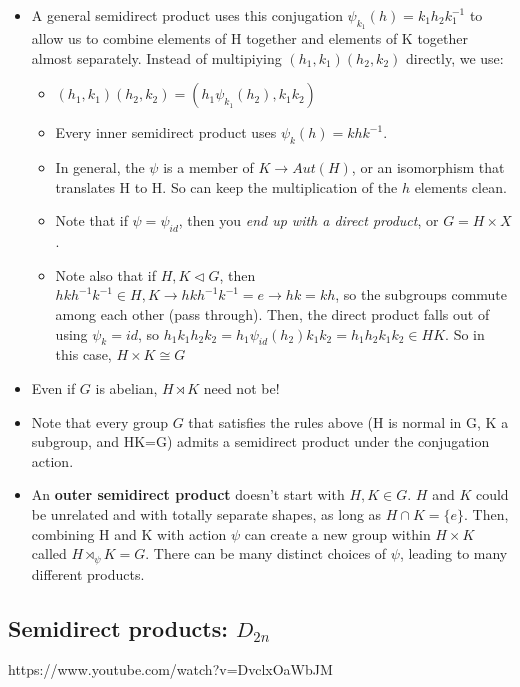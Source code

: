 \documentclass[11pt, oneside]{article}   	%
\begin{document}
\begin{itemize}
\begin{itemize}
 \end{itemize}
 \item A general semidirect product uses this conjugation $\psi_{k_1}(h) = k_1h_2k_1^{-1}$ to allow us to combine elements of H together and elements of K together almost separately.  Instead of multipiying $(h_1, k_1)(h_2, k_2)$ directly, we use:
 \begin{itemize}
 \item $(h_1, k_1)(h_2, k_2) = (h_1 \psi_{k_1}(h_2), k_1k_2)$
 \item Every inner semidirect product uses $\psi_k(h) = khk^{-1}$.
 \item In general, the $\psi$ is a member of $K \rightarrow Aut(H)$, or an isomorphism that translates H to H.  So can keep the multiplication of the $h$ elements clean.
 \item Note that if $\psi = \psi_{id}$, then you \emph{end up with a direct product}, or $G = H \times X$.
 \item Note also that if $H, K \triangleleft G$, then $hkh^{-1}k^{-1} \in H, K \rightarrow hkh^{-1}k^{-1} = e \rightarrow hk = kh$, so the subgroups commute among each other (pass through).  Then, the direct product falls out of using $\psi_k = id$, so $h_1k_1h_2k_2 = h_1\psi_{id}(h_2)k_1k_2 = h_1h_2k_1k_2\in HK$.  So in this case, $H \times K \cong G$
 \end{itemize}
 \item Even if $G$ is abelian, $H \rtimes K$ need not be! 
 \item Note that every group $G$ that satisfies the rules above (H is normal in G, K a subgroup, and HK=G) admits a semidirect product under the conjugation action.  
 \item An \textbf{outer semidirect product} doesn't start with $H, K \in G$.  $H$ and $K$ could be unrelated and with totally separate shapes, as long as $H  \cap K = \{e\}$.  Then, combining H and K with action $\psi$ can create a new group within $H \times K$ called $H \rtimes_{\psi} K  = G$.  There can be many distinct choices of $\psi$, leading to many different products.
 \end{itemize}
 
 \subsection{Semidirect products: $D_{2n}$}
https://www.youtube.com/watch?v=DvclxOaWbJM
\end{document}
